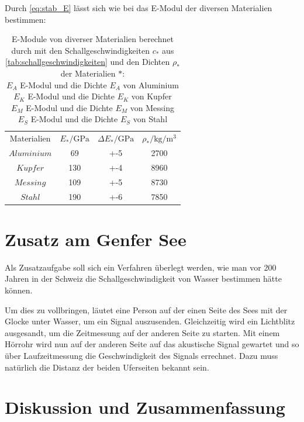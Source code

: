 \documentclass[11pt]{scrartcl}
\begin{document}
Durch \autoref{eq:stab_E} lässt sich wie bei 
das E-Modul der diversen Materialien bestimmen:

\begin{table}[H]
    \centering
    \caption{E-Module von diverser Materialien berechnet durch
        mit den Schallgeschwindigkeiten $c_*$ aus \autoref{tab:schallgeschwindigkeiten}
        und den Dichten $\rho_*$ der Materialien $*$:\\
    $E_A$ E-Modul und die Dichte $E_A$ von Aluminium \\
    $E_K$ E-Modul und die Dichte $E_K$ von Kupfer \\
    $E_M$ E-Modul und die Dichte $E_M$ von Messing \\
    $E_S$ E-Modul und die Dichte $E_S$ von Stahl \\}
    \label{tab:label}
    \begin{tabular}{c|S|S|S}
        Materialien & {$E_* / \si{\GPa}$} & {$\Delta E_* / \si{\GPa}$} & {$\rho_* / \si{\kg\per\meter\cubed}$}\\
        $Aluminium$ & 69                  & +-5           & 2700 \\
        $Kupfer$    & 130                 & +-4           & 8960 \\
        $Messing$   & 109                 & +-5           & 8730 \\
        $Stahl$     & 190                 & +-6           & 7850 \\
    \end{tabular}
\end{table}

\section{Zusatz am Genfer See}
Als Zusatzaufgabe soll sich ein Verfahren überlegt werden, wie man vor 200
Jahren in der Schweiz die Schallgeschwindigkeit von Wasser bestimmen hätte
können.

Um dies zu vollbringen, läutet eine Person auf der einen Seite des Sees mit der
Glocke unter Wasser, um ein Signal auszusenden. Gleichzeitig wird ein
Lichtblitz ausgesandt, um die Zeitmessung auf der anderen Seite zu starten. Mit
einem Hörrohr wird nun auf der anderen Seite auf das akustische Signal gewartet
und so über Laufzeitmessung die Geschwindigkeit des Signals errechnet. Dazu
muss natürlich die Distanz der beiden Uferseiten bekannt sein.

\section{Diskussion und Zusammenfassung}
\label{sec:diskussion_zusammenfassung}
\end{document}

